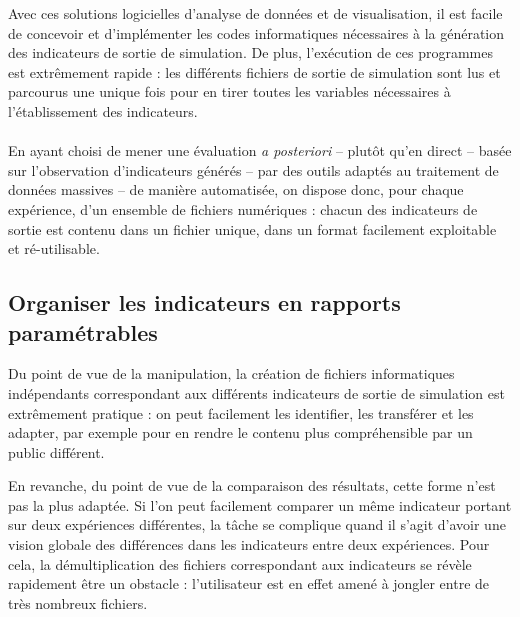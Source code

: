 Avec ces solutions logicielles d'analyse de données et de visualisation, il est facile de concevoir et d'implémenter les codes informatiques nécessaires à la génération des indicateurs de sortie de simulation.
De plus, l'exécution de ces programmes est extrêmement rapide :  les différents fichiers de sortie de simulation sont lus et parcourus une unique fois pour en tirer toutes les variables nécessaires à l'établissement des indicateurs.

\paragraph[Conclusion intermédiaire]{}
En ayant choisi de mener une évaluation \textit{a posteriori} -- plutôt qu'en direct -- basée sur l'observation d'indicateurs générés -- par des outils adaptés au traitement de données massives -- de manière automatisée, on dispose donc, pour chaque expérience, d'un ensemble de fichiers numériques : chacun des indicateurs  de sortie est contenu dans un fichier unique, dans un format facilement exploitable et ré-utilisable. 

\subsection{Organiser les indicateurs en rapports paramétrables}

Du point de vue de la manipulation, la création de fichiers informatiques indépendants correspondant aux différents indicateurs de sortie de simulation est extrêmement pratique : on peut facilement les identifier, les transférer et les adapter, par exemple pour en rendre le contenu plus compréhensible par un public différent.

En revanche, du point de vue de la comparaison des résultats, cette forme n'est pas la plus adaptée.
Si l'on peut facilement comparer un même indicateur portant sur deux expériences différentes, la tâche se complique quand il s'agit d'avoir une vision globale des différences dans les indicateurs entre deux expériences.
Pour cela, la démultiplication des fichiers correspondant aux indicateurs se révèle rapidement être un obstacle : l'utilisateur est en effet amené à jongler entre de très nombreux fichiers.

